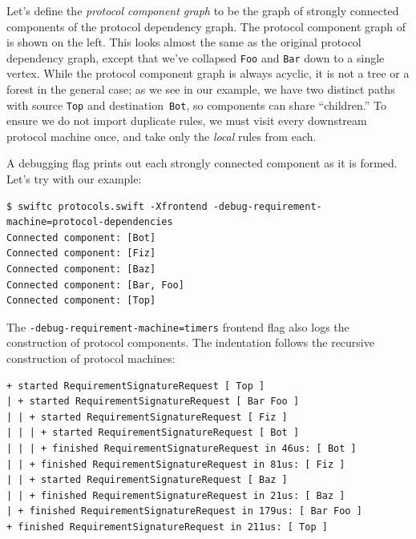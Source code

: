\documentclass[../generics]{subfiles}
\begin{document}
\begin{figure}
\end{figure}

Let's define the \emph{protocol component graph} to be the graph of strongly connected components of the protocol dependency graph. The protocol component graph of  is shown on the left. This looks almost the same as the original protocol dependency graph, except that we've collapsed \texttt{Foo} and \texttt{Bar} down to a single vertex. While the protocol component graph is always acyclic, it is not a tree or a forest in the general case; as we see in our example, we have two distinct paths with source \texttt{Top} and destination~\texttt{Bot}, so components can share ``children.'' To ensure we do not import duplicate rules, we must visit every downstream protocol machine once, and take only the \emph{local} rules from each.

A debugging flag prints out each strongly connected component as it is formed. Let's try with our example:
\begin{Verbatim}[fontsize=\footnotesize,numbers=none]
$ swiftc protocols.swift -Xfrontend -debug-requirement-machine=protocol-dependencies
Connected component: [Bot]
Connected component: [Fiz]
Connected component: [Baz]
Connected component: [Bar, Foo]
Connected component: [Top]
\end{Verbatim}

The
\texttt{-debug-requirement-machine=timers} frontend flag also logs the construction of protocol components. The indentation follows the recursive construction of protocol machines:
\begin{Verbatim}[fontsize=\footnotesize,numbers=none]
+ started RequirementSignatureRequest [ Top ]
| + started RequirementSignatureRequest [ Bar Foo ]
| | + started RequirementSignatureRequest [ Fiz ]
| | | + started RequirementSignatureRequest [ Bot ]
| | | + finished RequirementSignatureRequest in 46us: [ Bot ]
| | + finished RequirementSignatureRequest in 81us: [ Fiz ]
| | + started RequirementSignatureRequest [ Baz ]
| | + finished RequirementSignatureRequest in 21us: [ Baz ]
| + finished RequirementSignatureRequest in 179us: [ Bar Foo ]
+ finished RequirementSignatureRequest in 211us: [ Top ]
\end{Verbatim}
\end{document}
